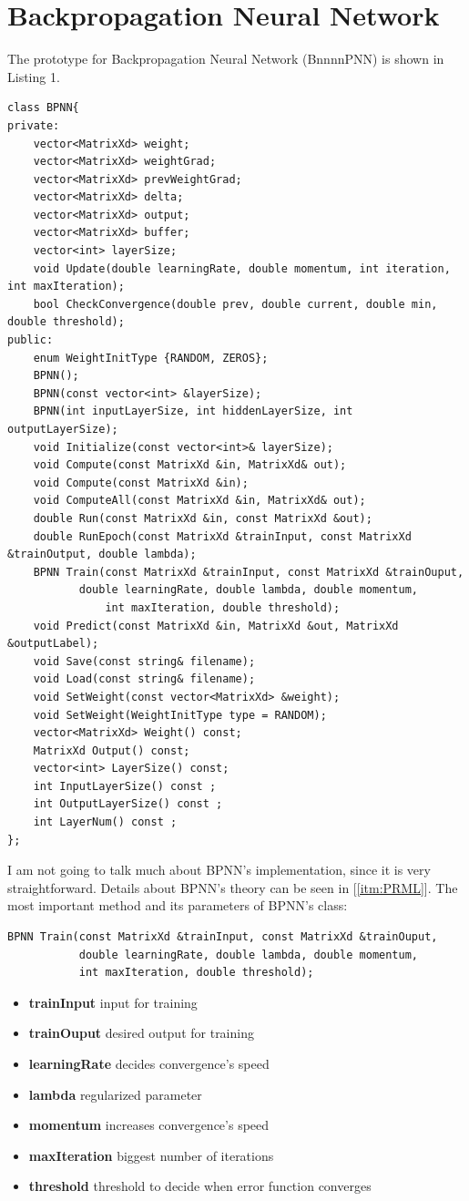 \documentclass[a4paper, 11pt]{article}
\begin{document}
\section{Backpropagation Neural Network}
The prototype for Backpropagation Neural Network (BnnnnPNN) is shown in Listing 1.
\begin{lstlisting}[caption={Backpropagation Neural Network Class (bpnn.hpp)}]
class BPNN{
private:
    vector<MatrixXd> weight;
    vector<MatrixXd> weightGrad;
    vector<MatrixXd> prevWeightGrad;
    vector<MatrixXd> delta;
    vector<MatrixXd> output;
    vector<MatrixXd> buffer;
    vector<int> layerSize;
    void Update(double learningRate, double momentum, int iteration, int maxIteration);
    bool CheckConvergence(double prev, double current, double min, double threshold);
public:
    enum WeightInitType {RANDOM, ZEROS};
    BPNN();
    BPNN(const vector<int> &layerSize);
    BPNN(int inputLayerSize, int hiddenLayerSize, int outputLayerSize);
    void Initialize(const vector<int>& layerSize);
    void Compute(const MatrixXd &in, MatrixXd& out);
    void Compute(const MatrixXd &in);
    void ComputeAll(const MatrixXd &in, MatrixXd& out);
    double Run(const MatrixXd &in, const MatrixXd &out);
    double RunEpoch(const MatrixXd &trainInput, const MatrixXd &trainOutput, double lambda);
    BPNN Train(const MatrixXd &trainInput, const MatrixXd &trainOuput, 
	       double learningRate, double lambda, double momentum, 
               int maxIteration, double threshold);
    void Predict(const MatrixXd &in, MatrixXd &out, MatrixXd &outputLabel);
    void Save(const string& filename);
    void Load(const string& filename);
    void SetWeight(const vector<MatrixXd> &weight);
    void SetWeight(WeightInitType type = RANDOM);
    vector<MatrixXd> Weight() const;
    MatrixXd Output() const;
    vector<int> LayerSize() const;
    int InputLayerSize() const ;
    int OutputLayerSize() const ;
    int LayerNum() const ;
};
\end{lstlisting}
I am not going to talk much about BPNN's implementation, since it is very straightforward. Details about BPNN's theory can be seen in [\ref{itm:PRML}]. The most important method and its parameters of BPNN's class:
\begin{lstlisting}
BPNN Train(const MatrixXd &trainInput, const MatrixXd &trainOuput, 
           double learningRate, double lambda, double momentum, 
           int maxIteration, double threshold);
\end{lstlisting}
\begin{itemize}
\item \textbf{trainInput} input for training
\item \textbf{trainOuput} desired output for training
\item \textbf{learningRate} decides convergence's speed
\item \textbf{lambda} regularized parameter
\item \textbf{momentum} increases convergence's speed
\item \textbf{maxIteration} biggest number of iterations
\item \textbf{threshold} threshold to decide when error function converges
\end{itemize}
\end{document}
